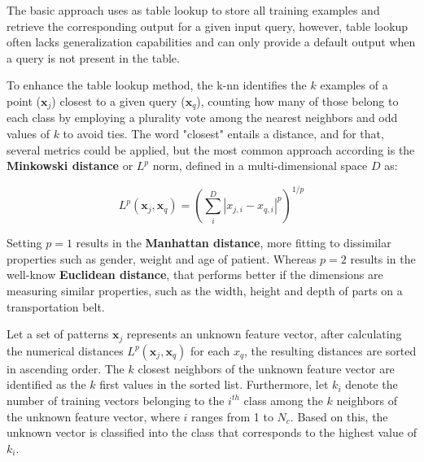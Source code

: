 The basic approach uses as table lookup to store all training examples and retrieve the corresponding output for a given input query, however, table lookup often lacks generalization capabilities and can only provide a default output when a query is not present in the table.

To enhance the table lookup method, the \gls{k-nn} identifies the $k$ examples of a point ($\mathbf{x}_j$) closest to a given query ($\mathbf{x}_q$), counting how many of those belong to each class by employing a plurality vote among the nearest neighbors and odd values of $k$ to avoid ties. The word "closest" entails a distance, and for that, several metrics could be applied, but the most common approach according \textcite{Russel2010} is the \textbf{Minkowski distance} or $L^p$ norm, defined in a multi-dimensional space $D$ as:

\begin{equation}
    \label{eq:minkowski_distance}
L^p\left(\mathbf{x}_j, \mathbf{x}_q\right)=\left(\sum_i^D\left|x_{j, i}-x_{q, i}\right|^p\right)^{1 / p}
\end{equation}

Setting $p=1$ results in the \textbf{Manhattan distance}, more fitting to dissimilar properties such as gender, weight and age of patient. Whereas $p=2$ results in the well-know \textbf{Euclidean distance}, that performs better if the dimensions are measuring similar properties, such as the width, height and depth of parts on a transportation belt.

Let a set of patterns $\mathbf{x}_j$ represents an unknown feature vector, after calculating the numerical distances $L^p\left(\mathbf{x}_j, \mathbf{x}_q\right)$ for each ${x}_q$, the resulting distances are sorted in ascending order. The $k$ closest neighbors of the unknown feature vector are identified as the $k$ first values in the sorted list. Furthermore, let $k_i$ denote the number of training vectors belonging to the $i^{t h}$ class among the $k$ neighbors of the unknown feature vector, where $i$ ranges from 1 to $N_c$. Based on this, the unknown vector is classified into the class that corresponds to the highest value of $k_i$. 


